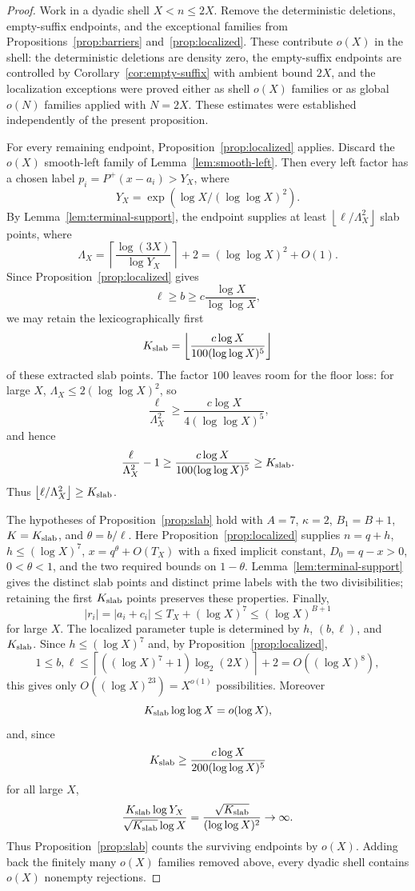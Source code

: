 \documentclass[11pt]{article}
\theoremstyle{definition}
\newcommand{\pplus}{P^+}
\newcommand{\floor}[1]{\left\lfloor #1\right\rfloor}
\newcommand{\ceil}[1]{\left\lceil #1\right\rceil}
\newcommand{\1}{\mathbf 1}
\begin{document}
\begin{proof}
Work in a dyadic shell \(X<n\le2X\).  Remove the deterministic deletions,
empty-suffix endpoints, and the exceptional families from
Propositions~\ref{prop:barriers} and~\ref{prop:localized}.  These contribute
\(o(X)\) in the shell: the deterministic deletions are density zero, the
empty-suffix endpoints are controlled by Corollary~\ref{cor:empty-suffix} with
ambient bound \(2X\), and the localization exceptions were proved either as
shell \(o(X)\) families or as global \(o(N)\) families applied with \(N=2X\).
These estimates were established independently of the present proposition.

For every remaining endpoint, Proposition~\ref{prop:localized} applies.
Discard the \(o(X)\) smooth-left family of Lemma~\ref{lem:smooth-left}.  Then
every left factor has a chosen label \(p_i=\pplus(x-a_i)>Y_X\), where
\[
  Y_X=\exp(\log X/(\log\log X)^2).
\]
By Lemma~\ref{lem:terminal-support}, the endpoint supplies at least
\(\floor{\ell/\Lambda_X^2}\) slab points, where
\[
  \Lambda_X=\ceil{\frac{\log(3X)}{\log Y_X}}+2
  =(\log\log X)^2+O(1).
\]
Since Proposition~\ref{prop:localized} gives
\[
  \ell\ge b\ge c\frac{\log X}{\log\log X},
\]
we may retain the lexicographically first
\[
  K_{\rm slab}=
  \floor{\frac{c\log X}{100(\log\log X)^5}}
\]
of these extracted slab points.  The factor \(100\) leaves room for the floor
loss: for large \(X\), \(\Lambda_X\le2(\log\log X)^2\), so
\[
  \frac{\ell}{\Lambda_X^2}\ge
  \frac{c\log X}{4(\log\log X)^5},
\]
and hence
\[
  \frac{\ell}{\Lambda_X^2}-1
  \ge \frac{c\log X}{100(\log\log X)^5}
  \ge K_{\rm slab}.
\]
Thus \(\floor{\ell/\Lambda_X^2}\ge K_{\rm slab}\).

The hypotheses of Proposition~\ref{prop:slab} hold with \(A=7\), \(\kappa=2\),
\(B_1=B+1\), \(K=K_{\rm slab}\), and \(\theta=b/\ell\).  Here
Proposition~\ref{prop:localized} supplies \(n=q+h\), \(h\le(\log X)^7\),
\(x=q^\theta+O(T_X)\) with a fixed implicit constant, \(D_0=q-x>0\),
\(0<\theta<1\), and the two required bounds on \(1-\theta\).
Lemma~\ref{lem:terminal-support} gives the distinct
slab points and distinct prime labels with the two divisibilities; retaining
the first \(K_{\rm slab}\) points preserves these properties.  Finally,
\[
  |r_i|=|a_i+c_i|\le T_X+(\log X)^7\le(\log X)^{B+1}
\]
for large \(X\).  The localized parameter tuple is determined by \(h\),
\((b,\ell)\), and \(K_{\rm slab}\).  Since \(h\le(\log X)^7\) and, by
Proposition~\ref{prop:localized},
\[
  1\le b,\ell\le \ceil{((\log X)^7+1)\log_2(2X)}+2=O((\log X)^8),
\]
this gives only
\(O((\log X)^{23})=X^{o(1)}\) possibilities.  Moreover
\[
  K_{\rm slab}\log\log X=o(\log X),
\]
and, since
\[
  K_{\rm slab}\ge \frac{c\log X}{200(\log\log X)^5}
\]
for all large \(X\),
\[
  \frac{K_{\rm slab}\log Y_X}{\sqrt{K_{\rm slab}}\log X}
  =\frac{\sqrt{K_{\rm slab}}}{(\log\log X)^2}\to\infty.
\]
Thus Proposition~\ref{prop:slab} counts the surviving endpoints by \(o(X)\).
Adding back the finitely many \(o(X)\) families removed above, every dyadic
shell contains \(o(X)\) nonempty rejections.


\end{proof}
\end{document}
